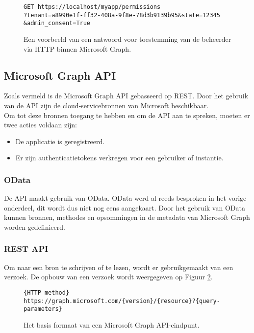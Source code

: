 \begin{figure}[!h]
    \footnotesize\begin{verbatim}
GET https://localhost/myapp/permissions
?tenant=a8990e1f-ff32-408a-9f8e-78d3b9139b95&state=12345
&admin_consent=True
    \end{verbatim}    
    \caption[Voorbeeld Adminconsent respons Microsoft Graph]{Een voorbeeld van een antwoord voor toestemming van de beheerder via \ac{HTTP} binnen Microsoft Graph.}
    \label{MSGRARES}
\end{figure}

\subsection{Microsoft Graph API}

Zoals vermeld is de Microsoft Graph \Ac{API} gebasseerd op \Ac{REST}. Door het gebruik van de \ac{API} zijn de cloud-servicebronnen van Microsoft beschikbaar. \\

Om tot deze bronnen toegang te hebben en om de \Ac{API} aan te spreken, moeten er twee acties voldaan zijn:

\begin{itemize}
    \item De applicatie is geregistreerd.
    \item Er zijn authenticatietokens verkregen voor een gebruiker of instantie.
\end{itemize}

\subsubsection{OData}

De \ac{API} maakt gebruik van OData. OData werd al reeds besproken in het vorige onderdeel, dit wordt dus niet nog eens aangekaart. Door het gebruik van OData kunnen bronnen, methodes en opsommingen in de metadata van Microsoft Graph worden gedefinieerd.

\subsubsection{REST API}

Om naar een bron te schrijven of te lezen, wordt er gebruikgemaakt van een verzoek. De opbouw van een verzoek wordt weergegeven op Figuur \ref{RAM}. \\

\begin{figure}[h]
    \footnotesize\begin{verbatim}{HTTP method} https://graph.microsoft.com/{version}/{resource}?{query-parameters}
    \end{verbatim}    
    \caption[Basis formaat Microsoft Graph API-eindpunt]{Het basis formaat van een Microsoft Graph \Ac{API}-eindpunt.}
    \label{RAM}
\end{figure}

